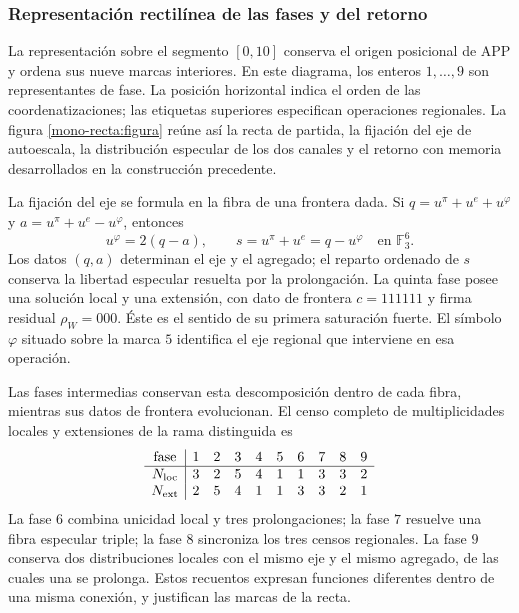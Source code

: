 \subsubsection{Representación rectilínea de las fases y del retorno}
\label{mono-recta:desarrollo}

La representación sobre el segmento \([0,10]\) conserva el origen
posicional de APP y ordena sus nueve marcas interiores. En este diagrama,
los enteros \(1,\ldots,9\) son representantes de fase. La posición
horizontal indica el orden de las coordenatizaciones; las etiquetas superiores
especifican operaciones regionales. La figura
\ref{mono-recta:figura} reúne así la recta de partida, la fijación del
eje de autoescala, la distribución especular de los dos canales y el
retorno con memoria desarrollados en la construcción precedente.



La fijación del eje se formula en la fibra de una frontera dada. Si
\(q=u^\pi+u^e+u^\varphi\) y
\(a=u^\pi+u^e-u^\varphi\), entonces
\[
 u^\varphi=2(q-a),\qquad s=u^\pi+u^e=q-u^\varphi
 \quad\text{en }\mathbb F_3^6.
\]
Los datos \((q,a)\) determinan el eje y el agregado; el reparto ordenado
de \(s\) conserva la libertad especular resuelta por la prolongación.
La quinta fase posee una solución local y una extensión, con dato
de frontera \(c=111111\) y firma residual \(\rho_W=000\). Éste es el
sentido de su primera saturación fuerte. El símbolo \(\varphi\)
situado sobre la marca \(5\) identifica el eje regional que interviene
en esa operación.

Las fases intermedias conservan esta descomposición dentro de cada fibra,
mientras sus datos de frontera evolucionan. El censo completo de
multiplicidades locales y extensiones de la rama distinguida es
\[
\begin{array}{c|rrrrrrrrr}
\text{fase}&1&2&3&4&5&6&7&8&9\\\hline
N_{\rm loc}&3&2&5&4&1&1&3&3&2\\
N_{\rm ext}&2&5&4&1&1&3&3&2&1
\end{array}
\]
La fase \(6\) combina unicidad local y tres prolongaciones; la fase
\(7\) resuelve una fibra especular triple; la fase \(8\) sincroniza
los tres censos regionales. La fase \(9\) conserva dos distribuciones
locales con el mismo eje y el mismo agregado, de las cuales una se
prolonga. Estos recuentos expresan funciones diferentes dentro de una
misma conexión, y justifican las marcas de la recta.

